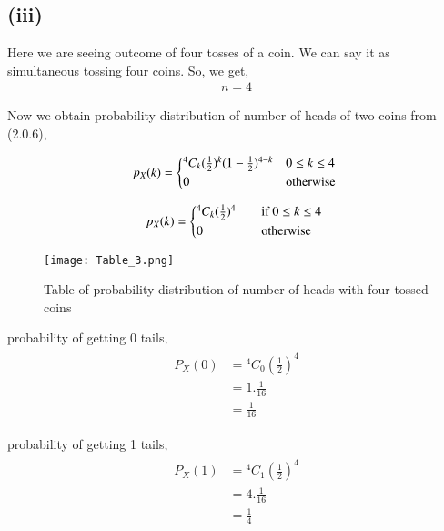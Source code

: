 \documentclass[journal,12pt,twocolumn]{IEEEtran}
\begin{document}
\subsection{(iii)}

Here we are seeing outcome of four tosses of a coin. We can say it as simultaneous tossing four coins. So, we get,
\begin{align}
    n=4
\end{align}

Now we obtain probability distribution of number of heads of two coins from (2.0.6),

\begin{align*}
   p_X(k) =
  \begin{cases*}
    {^4 C_k}(\frac{1}{2})^{k}(1-\frac{1}{2})^{4-k} & $0 \leq k \leq 4$\\
    0 & otherwise
  \end{cases*}
\end{align*}

\begin{align}
   p_X(k) =
  \begin{cases*}
    {^4 C_k}(\frac{1}{2})^{4} \quad& if $0 \leq k \leq 4$ \\
    0 \quad& otherwise
  \end{cases*}
\end{align}

\begin{figure}[h!]
    \centering
    \texttt{[image: Table\_3.png]}
    \caption{Table of probability distribution of number of heads with four tossed coins}
    \label{fig:Table_3}
\end{figure}

probability of getting 0 tails,
\begin{align}
    \begin{split}
    P_{X}(0) &= {^4C_0}(\frac{1}{2})^4\\
    &=1.\frac{1}{16}\\
    &=\frac{1}{16}
    \end{split}
\end{align}

probability of getting 1 tails,
\begin{align}
    \begin{split}
    P_{X}(1) &= {^4C_1}(\frac{1}{2})^4\\
    &=4.\frac{1}{16}\\
    &=\frac{1}{4}
    \end{split}
\end{align}
\end{document}

